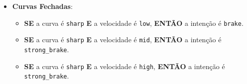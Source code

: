 \documentclass[12pt]{article}
\begin{document}
\begin{itemize}[label=\textbullet, leftmargin=*]
\begin{itemize}
    \end{itemize}
    \item \textbf{Curvas Fechadas}:
    \begin{itemize}
        \item \textbf{SE} a curva é \texttt{sharp} \textbf{E} a velocidade é \texttt{low}, \textbf{ENTÃO} a intenção é \texttt{brake}.
        \item \textbf{SE} a curva é \texttt{sharp} \textbf{E} a velocidade é \texttt{mid}, \textbf{ENTÃO} a intenção é \texttt{strong\_brake}.
        \item \textbf{SE} a curva é \texttt{sharp} \textbf{E} a velocidade é \texttt{high}, \textbf{ENTÃO} a intenção é \texttt{strong\_brake}.
    \end{itemize}
\end{itemize}
\end{document}
